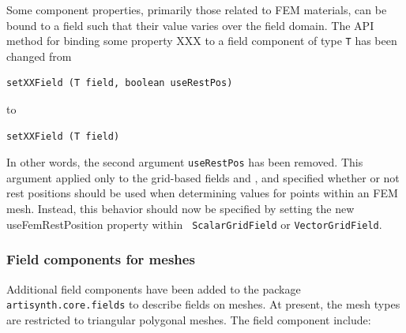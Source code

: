 \documentclass{article}
\begin{document}
Some component properties, primarily those related to FEM materials,
can be bound to a field such that their value varies over the field
domain. The API method for binding some property XXX to a field 
component of type {\tt T} has been changed from
%
\begin{lstlisting}[]
  setXXField (T field, boolean useRestPos)
\end{lstlisting}
%
to
%
\begin{lstlisting}[]
  setXXField (T field)
\end{lstlisting}
%
In other words, the second argument {\tt useRestPos} has been
removed. This argument applied only to the grid-based fields
 and
, and specified
whether or not rest positions should be used when determining values
for points within an FEM mesh. Instead, this behavior should now be
specified by setting the new {\sf useFemRestPosition} property within {\tt
ScalarGridField} or {\tt VectorGridField}.

\subsubsection{Field components for meshes}

Additional field components have been added to the package {\tt
artisynth.core.fields} to describe fields on meshes. At present, the
mesh types are restricted to triangular polygonal meshes. The field
component include:
\end{document}

